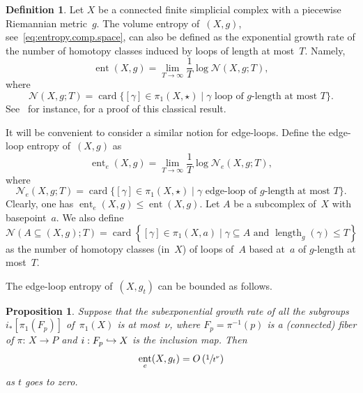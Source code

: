 \documentclass[11pt]{article}
\newcommand\hto{\mathrel{\lhook\joinrel\to}}
\let\oldsfrac\sfrac
\renewcommand{\sfrac}[2]{{\oldsfrac{#1}{#2}}}
\DeclareMathOperator{\card}{card}
\newtheorem{proposition}[theorem]{Proposition}
\theoremstyle{definition}
\newtheorem{definition}[theorem]{Definition}
\DeclareMathOperator{\ent}{ent}\let\eent\ent
\DeclareMathOperator{\length}{length}
\numberwithin{equation}{section}
\begin{document}
\begin{definition} \label{def:entN}
Let $X$ be a connected finite simplicial complex with a piecewise Riemannian metric~$g$.
The volume entropy of~$(X,g)$, see~\eqref{eq:entropy.comp.space}, can also be defined as the exponential growth rate of the number of homotopy classes induced by loops of length at most~$T$.\vspace*{-3pt}
Namely,
\begin{equation} \label{eq:entN}
\ent(X,g) = \lim_{T \to \infty} \frac{1}{T} \log \mathcal{N}(X,g; T),
\end{equation}
where\vspace*{-5pt}
\[
\mathcal{N}(X,g;T) = \card \{[\gamma] \in \pi_1(X,\star) \mid \gamma \mbox{ loop of } g\mbox{-length at most } T\}.
\]
See~\cite[Lem.\,2.3]{sab} for instance, for a proof of this classical result.

It will be convenient to consider a similar notion for edge-loops.
Define the edge-loop entropy of~$(X,g)$ as\vspace*{-3pt}
\[
\ent_e(X,g) = \lim_{T \to \infty} \frac{1}{T} \log \mathcal{N}_e(X,g;T),
\]
where
\[
\mathcal{N}_e(X,g;T) = \card \{[\gamma] \in \pi_1(X,\star) \mid \gamma \mbox{ edge-loop of } g\mbox{-length at most } T\}.
\]
Clearly, one has $\ent_e(X,g) \leq \ent(X,g)$. Let $A$ be a subcomplex of~$X$ with basepoint~$a$.
We also define\vspace*{-3pt}
\[
\mathcal{N}(A \subseteq (X,g); T) = \card \! \left\{[\gamma] \in \pi_1(X,a) \mid \gamma \subseteq A \mbox{ and } \length_g(\gamma) \leq T \right\}
\]
as the number of homotopy classes (in~$X$) of loops of~$A$ based at~$a$ of $g$-length at most~$T$.
\end{definition}

The edge-loop entropy of~$(X,g_t)$ can be bounded as follows.

\begin{proposition} \label{prop:log}
Suppose that the subexponential growth rate of all the subgroups $i_*[\pi_1(F_p)]$ of~$\pi_1(X)$ is at most~$\nu$, where $F_p=\pi^{-1}(p)$ is a (connected) fiber of \hbox{$\pi{:}\,X\!\to\! P$} and $i:F_p \hto X$ is the inclusion map.
Then\vspace*{-3pt}
\begin{equation} \label{eq:log}
\eent_e(X,g_t) = O \left(\sfrac{1}{t^\nu} \right)
\end{equation}
as $t$ goes to zero.
\end{proposition}
\end{document}
